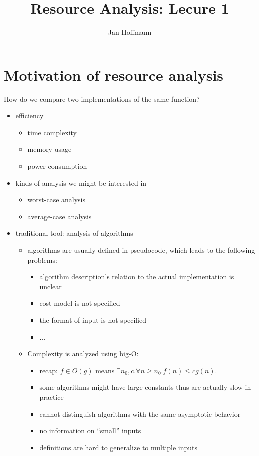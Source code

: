 \documentclass[ manuscript, review,screen, nonacm]{acmart}
\begin{document}
\title{Resource Analysis: Lecure 1}

\author{Jan Hoffmann}

\maketitle



\section{Motivation of resource analysis} 
How do we compare two implementations of the same function? 
\begin{itemize}
  \item efficiency
  \begin{itemize}
    \item time complexity
    \item memory usage
    \item power consumption
  \end{itemize}
  \item kinds of analysis we might be interested in
    \begin{itemize}
        \item worst-case analysis  
        \item average-case analysis
    \end{itemize} 
  \item traditional tool: analysis of algorithms
  \begin{itemize}
      \item algorithms are usually defined in pseudocode, which leads to the following problems:
      \begin{itemize}
          \item algorithm description's relation to the actual implementation is unclear
          \item cost model is not specified
          \item the format of input is not specified
          \item ...
      \end{itemize}
      \item Complexity is analyzed using big-O:
    \begin{itemize}
        \item recap: $f \in O(g)$ means $\exists n_0, c. \forall n \geq n_0. f(n)\leq cg(n)$.
        \item some algorithms might have large constants thus are actually slow in practice
       \item cannot distinguish algorithms with the same asymptotic behavior
       \item no information on ``small'' inputs
      \item  definitions are hard to generalize to multiple inputs
     \end{itemize}
  \end{itemize}
\end{itemize}
\end{document}
